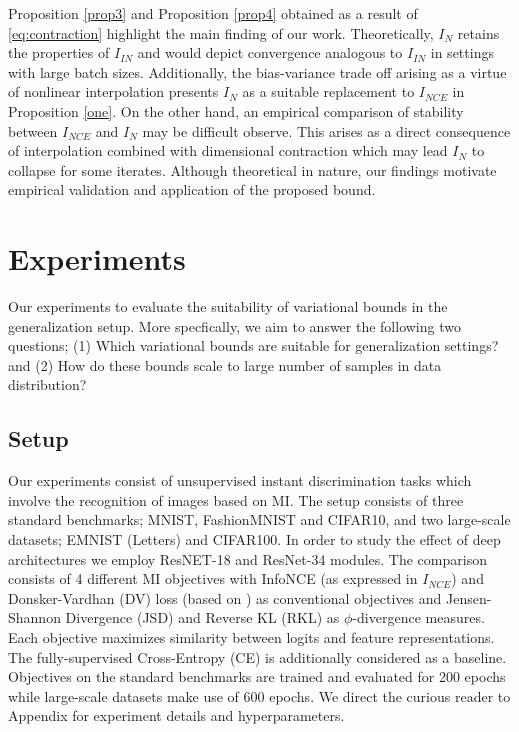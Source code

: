 \documentclass{article}
\begin{document}
Proposition \autoref{prop3} and Proposition \autoref{prop4} obtained as a result of \autoref{eq:contraction} highlight the main finding of our work. Theoretically, $I_{N}$ retains the properties of $I_{IN}$ and would depict convergence analogous to $I_{IN}$ in settings with large batch sizes. Additionally, the bias-variance trade off arising as a virtue of nonlinear interpolation presents $I_{N}$ as a suitable replacement to $I_{NCE}$ in Proposition \autoref{one}. On the other hand, an empirical comparison of stability between $I_{NCE}$ and $I_{N}$ may be difficult observe. This arises as a direct consequence of interpolation combined with dimensional contraction which may lead $I_{N}$ to collapse for some iterates. Although theoretical in nature, our findings motivate empirical validation and application of the proposed bound. 
\section{Experiments}
Our experiments to evaluate the suitability of variational bounds in the generalization setup. More specfically, we aim to answer the following two questions; (1) Which variational bounds are suitable for generalization settings? and (2) How do these bounds scale to large number of samples in data distribution? 

\subsection{Setup}
Our experiments consist of unsupervised instant discrimination tasks \cite{visual} which involve the recognition of images based on MI. The setup consists of three standard benchmarks; MNIST, FashionMNIST and CIFAR10, and two large-scale datasets; EMNIST (Letters) and CIFAR100. In order to study the effect of deep architectures we employ ResNET-18 and ResNet-34 modules. The comparison consists of 4 different MI objectives with InfoNCE (as expressed in $I_{NCE}$) and Donsker-Vardhan (DV) loss (based on \cite{infomax}) as conventional objectives and Jensen-Shannon Divergence (JSD) and Reverse KL (RKL) as $\phi$-divergence measures. Each objective maximizes similarity between logits and feature representations. The fully-supervised Cross-Entropy (CE) is additionally considered as a baseline. Objectives on the standard benchmarks are trained and evaluated for 200 epochs while large-scale datasets make use of 600 epochs. We direct the curious reader to Appendix for experiment details and hyperparameters.  
\end{document}
